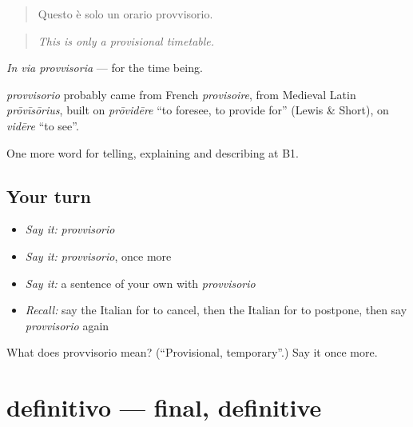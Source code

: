 \begin{quote}
Questo è solo un orario provvisorio.
\end{quote}

\begin{quote}
\emph{This is only a provisional timetable.}
\end{quote}

\emph{In via provvisoria} — for the time being.

\begin{cousinweb}
\emph{provvisorio} probably came from French \emph{provisoire}, from Medieval Latin \emph{prōvīsōrius}, built on \emph{prōvidēre} \textquotedblleft{}to foresee, to provide for\textquotedblright{} (Lewis \& Short), on \emph{vidēre} \textquotedblleft{}to see\textquotedblright{}.
\end{cousinweb}

\begin{grammarlens}[title={What you've built}]
One more word for telling, explaining and describing at B1.
\end{grammarlens}

\subsection*{Your turn}
\begin{itemize}
\raggedright
  \item \emph{Say it:} \emph{provvisorio}
  \item \emph{Say it:} \emph{provvisorio}, once more
  \item \emph{Say it:} a sentence of your own with \emph{provvisorio}
  \item \emph{Recall:} say the Italian for to cancel, then the Italian for to postpone, then say \emph{provvisorio} again
\end{itemize}

\begin{tcolorbox}[breakable,colback=teal!4,colframe=teal!35!black,title={Before you move on}]
What does provvisorio mean? (\textquotedblleft{}Provisional, temporary\textquotedblright{}.) Say it once more.
\end{tcolorbox}
\section[definitivo]{definitivo — final, definitive}

\label{lesson:IT-C375-definitivo}




